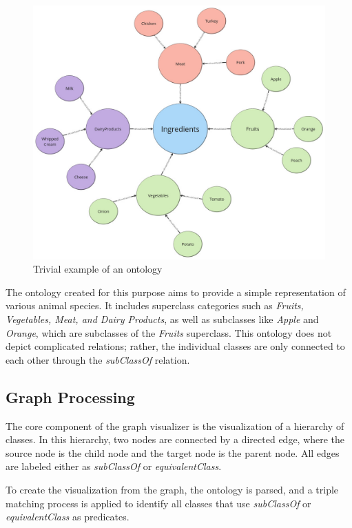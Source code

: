 \begin{figure}[H]
    \includegraphics[scale=0.4]{Graphics/simple_ontology.jpg}
    \caption{Trivial example of an ontology}
\end{figure}
    
The ontology created for this purpose aims to provide a simple representation of various animal species. It includes superclass categories such as \textit{Fruits, Vegetables, Meat, and Dairy Products}, as well as subclasses like \textit{Apple} and \textit{Orange}, which are subclasses of the \textit{Fruits} superclass. This ontology does not depict complicated relations; rather, the individual classes are only connected to each other through the \textit{subClassOf} relation.

\subsection{Graph Processing}
The core component of the graph visualizer is the visualization of a hierarchy of classes. In this hierarchy, two nodes are connected by a directed edge, 
where the source node is the child node and the target node is the parent node. All edges are labeled either as \textit{subClassOf} or \textit{equivalentClass}.

To create the visualization from the graph, the ontology is parsed, and a triple matching process is applied to identify 
all classes that use \textit{subClassOf} or \textit{equivalentClass} as predicates.


